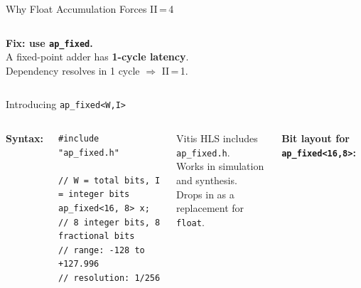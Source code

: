 \documentclass[aspectratio=169,12pt]{beamer}
\begin{document}
\begin{frame}{Why Float Accumulation Forces II\,=\,4}
\begin{columns}[T,totalwidth=\textwidth]
  \vspace{8pt}
  \colorbox{Teal!10}{\parbox{\dimexpr\linewidth-2\fboxsep\relax}{\vspace{4pt}
    {\color{Teal}\bfseries Fix: use \texttt{ap\_fixed}.}\\[2pt]
    {\small A fixed-point adder has \textbf{1-cycle latency}.\\
    Dependency resolves in 1 cycle $\Rightarrow$ II\,=\,1.}
  \vspace{4pt}}}

\end{columns}
\end{frame}

\begin{frame}[fragile]{Introducing \texttt{ap\_fixed<W,I>}}
\vspace{0.05cm}
\begin{columns}[T,totalwidth=\textwidth]

  {\small\color{Navy}\bfseries Syntax:}
  \vspace{2pt}
\begin{lstlisting}
#include "ap_fixed.h"

// W = total bits, I = integer bits
ap_fixed<16, 8> x;
// 8 integer bits, 8 fractional bits
// range: -128 to +127.996
// resolution: 1/256
\end{lstlisting}

  \vspace{6pt}
  \colorbox{Navy!8}{\parbox{\dimexpr\linewidth-2\fboxsep\relax}{\vspace{3pt}
    {\small Vitis HLS includes \texttt{ap\_fixed.h}.\\
    Works in simulation and synthesis.\\
    Drops in as a replacement for \texttt{float}.}
  \vspace{3pt}}}

  \vspace{0.1cm}

  {\small\color{Navy}\bfseries Bit layout for \texttt{ap\_fixed<16,8>}:}
  \vspace{4pt}



\end{columns}
\end{frame}
\end{document}
